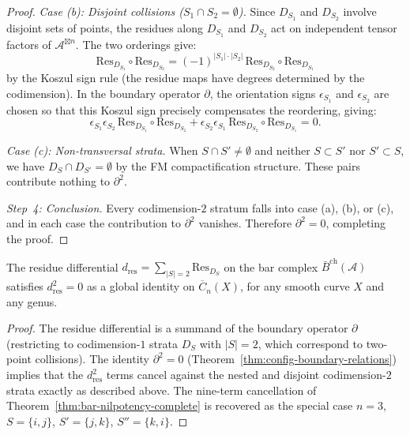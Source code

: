 \begin{proof}
\emph{Case (b): Disjoint collisions ($S_1 \cap S_2 = \emptyset$).}
Since $D_{S_1}$ and $D_{S_2}$ involve disjoint sets of points,
the residues along $D_{S_1}$ and $D_{S_2}$ act on independent tensor
factors of $\mathcal{A}^{\boxtimes n}$.  The two orderings give:
\[
  \mathrm{Res}_{D_{S_1}} \circ \mathrm{Res}_{D_{S_2}} =
  (-1)^{|S_1| \cdot |S_2|}\, \mathrm{Res}_{D_{S_2}} \circ \mathrm{Res}_{D_{S_1}}
\]
by the Koszul sign rule (the residue maps have degrees determined by the
codimension).  In the boundary operator $\partial$, the orientation signs
$\epsilon_{S_1}$ and $\epsilon_{S_2}$ are chosen so that this Koszul sign
precisely compensates the reordering, giving:
\[
  \epsilon_{S_1}\epsilon_{S_2}\, \mathrm{Res}_{D_{S_1}} \circ
  \mathrm{Res}_{D_{S_2}} +
  \epsilon_{S_2}\epsilon_{S_1}\, \mathrm{Res}_{D_{S_2}} \circ
  \mathrm{Res}_{D_{S_1}} = 0.
\]

\emph{Case (c): Non-transversal strata.}
When $S \cap S' \neq \emptyset$ and neither $S \subset S'$ nor
$S' \subset S$, we have $D_S \cap D_{S'} = \emptyset$ by the FM
compactification structure.  These pairs contribute nothing to
$\partial^2$.

\emph{Step~4: Conclusion.}
Every codimension-$2$ stratum falls into case (a), (b), or (c), and in
each case the contribution to $\partial^2$ vanishes.  Therefore
$\partial^2 = 0$, completing the proof.
\end{proof}

\begin{corollary}[\texorpdfstring{$d_{\mathrm{res}}^2 = 0$}{d\_res\textasciicircum 2 = 0} globally; \ClaimStatusProvedHere]\label{cor:dres-squared-global}
The residue differential $d_{\mathrm{res}} = \sum_{|S|=2} \mathrm{Res}_{D_S}$
on the bar complex $\bar{B}^{\mathrm{ch}}(\mathcal{A})$ satisfies
$d_{\mathrm{res}}^2 = 0$ as a global identity on $\overline{C}_n(X)$, for
any smooth curve $X$ and any genus.
\end{corollary}

\begin{proof}
The residue differential is a summand of the boundary operator $\partial$
(restricting to codimension-$1$ strata $D_S$ with $|S| = 2$, which
correspond to two-point collisions).  The identity $\partial^2 = 0$
(Theorem~\ref{thm:config-boundary-relations}) implies that the
$d_{\mathrm{res}}^2$ terms cancel against the nested and disjoint
codimension-$2$ strata exactly as described above.  The nine-term
cancellation of Theorem~\ref{thm:bar-nilpotency-complete} is recovered
as the special case $n = 3$, $S = \{i,j\}$, $S' = \{j,k\}$,
$S'' = \{k,i\}$.
\end{proof}

